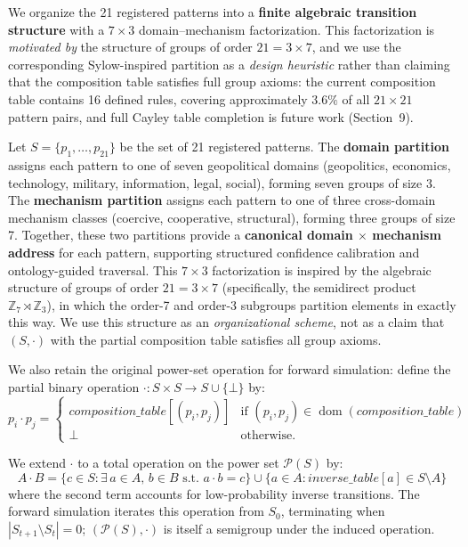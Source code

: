 \documentclass{llncs}
\begin{document}
We organize the 21 registered patterns into a \textbf{finite algebraic transition
structure} with a $7 \times 3$ domain--mechanism factorization. This factorization
is \emph{motivated by} the structure of groups of order $21 = 3 \times 7$, and we
use the corresponding Sylow-inspired partition as a \emph{design heuristic} rather
than claiming that the composition table satisfies full group axioms: the current
composition table contains 16 defined rules, covering approximately $3.6\%$ of all
$21 \times 21$ pattern pairs, and full Cayley table completion is future work
(Section~9).

Let $S = \{p_1, \ldots, p_{21}\}$ be the set of 21 registered patterns. The
\textbf{domain partition} assigns each pattern to one of seven geopolitical domains
(geopolitics, economics, technology, military, information, legal, social),
forming seven groups of size 3. The \textbf{mechanism partition} assigns each
pattern to one of three cross-domain mechanism classes (coercive, cooperative,
structural), forming three groups of size 7. Together, these two partitions
provide a \textbf{canonical domain $\times$ mechanism address} for each pattern,
supporting structured confidence calibration and ontology-guided traversal.
This $7 \times 3$ factorization is inspired by the algebraic structure of groups
of order $21 = 3 \times 7$ (specifically, the semidirect product $\mathbb{Z}_7
\rtimes \mathbb{Z}_3$), in which the order-7 and order-3 subgroups partition
elements in exactly this way. We use this structure as an \emph{organizational
scheme}, not as a claim that $(S, \cdot)$ with the partial composition table
satisfies all group axioms.

We also retain the original power-set operation for forward simulation:
define the partial binary operation
${\cdot} \colon S \times S \to S \cup \{\bot\}$ by:
\[
  p_i \cdot p_j =
  \begin{cases}
    \mathit{composition\_table}[(p_i, p_j)]
      & \text{if } (p_i, p_j) \in \operatorname{dom}(\mathit{composition\_table}) \\
    \bot & \text{otherwise.}
  \end{cases}
\]

We extend $\cdot$ to a total operation on the power set $\mathcal{P}(S)$
by:
\[
  A \cdot B = \{ c \in S : \exists\, a \in A,\, b \in B
               \text{ s.t.\ } a \cdot b = c \}
           \cup \{ a \in A : \mathit{inverse\_table}[a] \in S \setminus A \}
\]
where the second term accounts for low-probability inverse transitions.
The forward simulation iterates this operation from $S_0$, terminating
when $|S_{t+1} \setminus S_t| = 0$; $(\mathcal{P}(S), \cdot)$ is itself
a semigroup under the induced operation.
\end{document}
